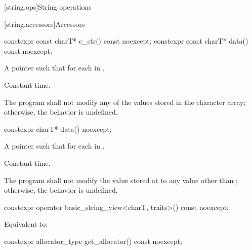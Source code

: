 [string.ops]{String operations}

[string.accessors]{Accessors}

%
%
\begin{itemdecl}
constexpr const charT* c_str() const noexcept;
constexpr const charT* data() const noexcept;
\end{itemdecl}

\begin{itemdescr}
\pnum
\returns
A pointer  such that  for each
 in .

\pnum
\complexity
Constant time.

\pnum
\remarks
The program shall not modify any of the values stored in the character array; otherwise, the behavior is undefined.
\end{itemdescr}

%
\begin{itemdecl}
constexpr charT* data() noexcept;
\end{itemdecl}

\begin{itemdescr}
\pnum
\returns
A pointer  such that  for each
 in .

\pnum
\complexity
Constant time.

\pnum
\remarks
The program shall not modify the value stored at 
to any value other than ; otherwise, the behavior is undefined.
\end{itemdescr}

%
\begin{itemdecl}
constexpr operator basic_string_view<charT, traits>() const noexcept;
\end{itemdecl}

\begin{itemdescr}
\pnum
\effects
Equivalent to:
\end{itemdescr}

%
\begin{itemdecl}
constexpr allocator_type get_allocator() const noexcept;
\end{itemdecl}

